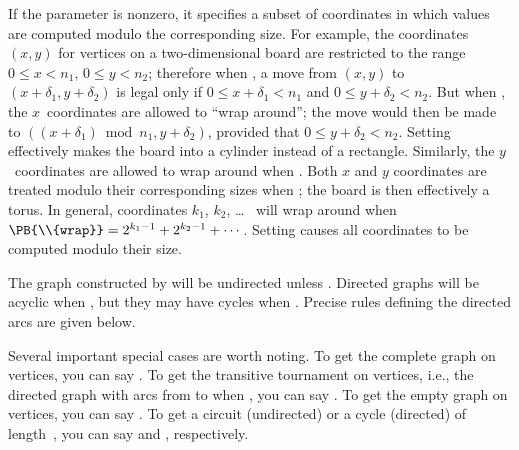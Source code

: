 If the  parameter is nonzero, it specifies a subset of
coordinates
in which values are computed modulo the corresponding size.
For example, the coordinates $(x,y)$ for vertices on a two-dimensional
board are restricted to the range $0\le x<n_1$, $0\le y<n_2$; therefore
when , a move from $(x,y)$ to $(x+\delta_1,y+\delta_2)$
is
legal only if $0\le x+\delta_1<n_1$ and $0\le y+\delta_2<n_2$.
But when , the $x$~coordinates are allowed to ``wrap
around'';
the move would then be made to $((x+\delta_1)\bmod n_1,y+\delta_2)$,
provided that $0\le y+\delta_2<n_2$. Setting  effectively
makes the board into a cylinder instead of a rectangle. Similarly, the
$y$~coordinates are allowed to wrap around when . Both
$x$ and
$y$ coordinates are treated modulo their corresponding sizes when
; the board is then effectively a torus.  In general,
coordinates $k_1$, $k_2$, \dots~ will wrap around when
$\PB{\\{wrap}}=2^{k_1-1}+2^{k_2-1}+\cdots\,$. Setting 
causes all
coordinates to be computed modulo their size.

The graph constructed by  will be undirected unless .
Directed  graphs will be acyclic when , but
they may
have cycles when . Precise rules defining the directed
arcs
are given below.

Several important special cases are worth noting. To get the complete graph
on  vertices, you can say . To get the
transitive tournament on  vertices, i.e., the directed graph
with arcs from  to  when , you can say .
To get the empty graph on  vertices, you can say .
To get a circuit (undirected) or a cycle (directed) of length~,
you can say  and ,
respectively.

